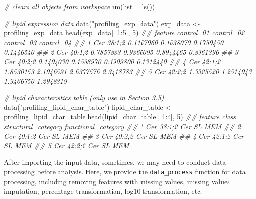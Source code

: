 \documentclass[]{article}
\newcommand{\hlnum}[1]{\textcolor[rgb]{0.816,0.125,0.439}{#1}}%
\newcommand{\hlstr}[1]{\textcolor[rgb]{0.251,0.627,0.251}{#1}}%
\newcommand{\hlcom}[1]{\textcolor[rgb]{0.502,0.502,0.502}{\textit{#1}}}%
\newcommand{\hlopt}[1]{\textcolor[rgb]{0,0,0}{#1}}%
\newcommand{\hlstd}[1]{\textcolor[rgb]{0.251,0.251,0.251}{#1}}%
\newcommand{\hlkwc}[1]{\textcolor[rgb]{0.251,0.251,0.251}{#1}}%
\newcommand{\hlkwd}[1]{\textcolor[rgb]{0.878,0.439,0.125}{#1}}%
\newenvironment{Shaded}{\begin{myshaded}}{\end{myshaded}}
\newcommand{\KeywordTok}[1]{\hlkwd{#1}}
\newcommand{\DataTypeTok}[1]{\hlkwc{#1}}
\newcommand{\DecValTok}[1]{\hlnum{#1}}
\newcommand{\StringTok}[1]{\hlstr{#1}}
\newcommand{\CommentTok}[1]{\hlcom{#1}}
\newcommand{\OperatorTok}[1]{\hlopt{#1}}
\newcommand{\NormalTok}[1]{\hlstd{#1}}
\begin{document}
\begin{Shaded}
\begin{Highlighting}[]
\CommentTok{# clears all objects from workspace}
\KeywordTok{rm}\NormalTok{(}\DataTypeTok{list =} \KeywordTok{ls}\NormalTok{())}

\CommentTok{# lipid expression data }
\KeywordTok{data}\NormalTok{(}\StringTok{"profiling_exp_data"}\NormalTok{)}
\NormalTok{exp_data <-}\StringTok{ }\NormalTok{profiling_exp_data}
\KeywordTok{head}\NormalTok{(exp_data[, }\DecValTok{1}\OperatorTok{:}\DecValTok{5}\NormalTok{], }\DecValTok{5}\NormalTok{)}
\CommentTok{##      feature control_01 control_02 control_03 control_04}
\CommentTok{## 1 Cer 38:1;2  0.1167960  0.1638070  0.1759450  0.1446540}
\CommentTok{## 2 Cer 40:1;2  0.7857833  0.9366095  0.8944465  0.8961396}
\CommentTok{## 3 Cer 40:2;2  0.1494030  0.1568970  0.1909800  0.1312440}
\CommentTok{## 4 Cer 42:1;2  1.8530153  2.1946591  2.6377576  2.3418783}
\CommentTok{## 5 Cer 42:2;2  1.3325520  1.2514943  1.9466750  1.2948319}

\CommentTok{# lipid characteristics table (only use in Section 3.5)}
\KeywordTok{data}\NormalTok{(}\StringTok{"profiling_lipid_char_table"}\NormalTok{)}
\NormalTok{lipid_char_table <-}\StringTok{ }\NormalTok{profiling_lipid_char_table}
\KeywordTok{head}\NormalTok{(lipid_char_table[, }\DecValTok{1}\OperatorTok{:}\DecValTok{4}\NormalTok{], }\DecValTok{5}\NormalTok{)}
\CommentTok{##      feature class structural_category functional_category}
\CommentTok{## 1 Cer 38:1;2   Cer                  SL                 MEM}
\CommentTok{## 2 Cer 40:1;2   Cer                  SL                 MEM}
\CommentTok{## 3 Cer 40:2;2   Cer                  SL                 MEM}
\CommentTok{## 4 Cer 42:1;2   Cer                  SL                 MEM}
\CommentTok{## 5 Cer 42:2;2   Cer                  SL                 MEM}
\end{Highlighting}
\end{Shaded}

After importing the input data, sometimes, we may need to conduct data processing before analysis. Here, we provide the \texttt{data\_process} function for data processing, including removing features with missing values, missing values imputation, percentage transformation, log10 transformation, etc.
\end{document}
